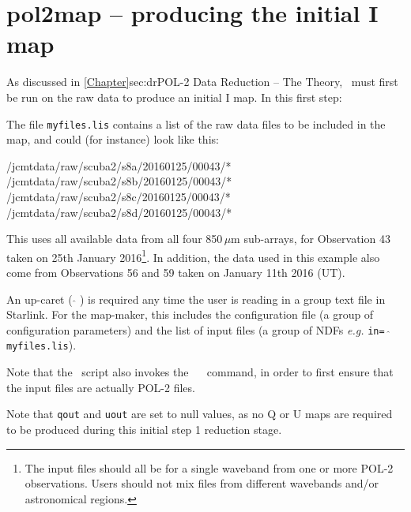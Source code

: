 \begin{terminalv}
\end{terminalv}


\section{pol2map -- producing the initial I map}
\label{sec:how-step1}

As discussed in \cref{Chapter}{sec:dr}{POL-2 Data Reduction -- The
  Theory}, \poltwomap\ must first be run on the raw data to produce an
initial I map.  In this first step:

\begin{terminalv}
\end{terminalv}

The file \texttt{myfiles.lis} contains a list of the raw data
files to be included in the map, and could (for instance) look like
this:

\begin{terminalv}
/jcmtdata/raw/scuba2/s8a/20160125/00043/*
/jcmtdata/raw/scuba2/s8b/20160125/00043/*
/jcmtdata/raw/scuba2/s8c/20160125/00043/*
/jcmtdata/raw/scuba2/s8d/20160125/00043/*
\end{terminalv}

This uses all available data from all four 850\,$\mu$m sub-arrays, for
Observation 43 taken on 25th January 2016\footnote{The input files
  should all be for a single waveband from one or more POL-2
  observations. Users should not mix files from different wavebands and/or
  astronomical regions.}. In addition, the data used in this example
also come from Observations 56 and 59 taken on January 11th 2016 (UT).

\begin{tip}
  An up-caret ( $ \hat{} $ ) is required any time the user is reading in
  a group text file in Starlink. For the map-maker, this includes the
  configuration file (a group of configuration parameters) and the
  list of input files (a group of NDFs \emph{e.g.} \texttt{in= $
    \hat{} $ myfiles.lis}).

  Note that the \poltwomap\ script also invokes the \ \smurf\
   command, in order to 
  first ensure that the input files are actually POL-2 files.
\end{tip}

Note that \texttt{qout} and \texttt{uout} are set to null values, as no
Q or U maps are required to be produced during this initial step 1
reduction stage.

